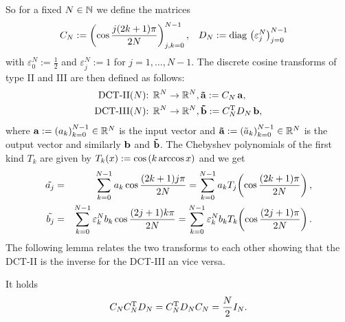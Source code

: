 So for a fixed $N \in \mathbb{N}$ we define the matrices
\begin{align}
  \nonumber
  C_N & := \left(\cos \frac{j(2k+1) \pi}{2N}\right)_{j,k = 0}^{N-1}, & D_N & := \text{\rm{diag}}\, \left(\varepsilon_j^N\right)_{j = 0}^{N-1}
\end{align}
with $\varepsilon_0^N := \frac{1}{2}$ and $\varepsilon_j^N := 1$ for $j = 1,\ldots,N-1$.
The discrete cosine transforms of type II and III are then defined as follows:
\begin{align}
  \nonumber
  \text{DCT-II($N$): } & \mathbb{R}^N \rightarrow \mathbb{R}^N, \mathbf{\tilde{a}} := C_{N}\, \mathbf{a},\\
  \nonumber
  \text{DCT-III($N$): } & \mathbb{R}^N \rightarrow \mathbb{R}^N, \mathbf{\tilde{b}} := C_{N}^{\text{\rm{T}}} D_{N}\, \mathbf{b}, 
\end{align}
where $\mathbf{a} := \left(a_k\right)_{k=0}^{N-1} \in \mathbb{R}^N$ is the input vector and $\mathbf{\tilde{a}} := 
\left(\tilde{a}_k\right)_{k=0}^{N-1} \in \mathbb{R}^N$ is the output vector and similarly $\mathbf{b}$ and $\mathbf{\tilde{b}}$. 
The Chebyshev polynomials of the first kind $T_{k}$ are given by $T_{k}{\hspace{-0.4ex}}\left(x\right) := \cos{\hspace{-0.4ex}}\left(k \arccos x\right)$ 
and we get
\begin{eqnarray*}
  \tilde{a_{j}} & = & \sum_{k = 0}^{N-1} a_{k} \cos \frac{(2k+1)j \pi}{2N} = \sum_{k = 0}^{N-1} a_{k} T_{j}{\hspace{-0.4ex}}\left(\cos \frac{(2k+1) \pi}{2N}\right),\\
  \tilde{b_{j}} & = & \sum_{k = 0}^{N-1} \varepsilon_k^N b_{k} \cos \frac{(2j+1)k \pi}{2N} = \sum_{k = 0}^{N-1} \varepsilon_k^N b_{k} T_{k}{\hspace{-0.4ex}}\left(\cos \frac{(2j+1) \pi}{2N}\right).\\
\end{eqnarray*}
The following lemma relates the two transforms to each other showing that the DCT-II is the inverse for the DCT-III an vice versa.
\begin{lemma}
  It holds
  $$ C_{N}C_{N}^{\text{\rm{T}}}D_{N} = C_{N}^{\text{\rm{T}}}D_{N}C_{N} = \frac{N}{2} I_{N}. $$
\end{lemma}

